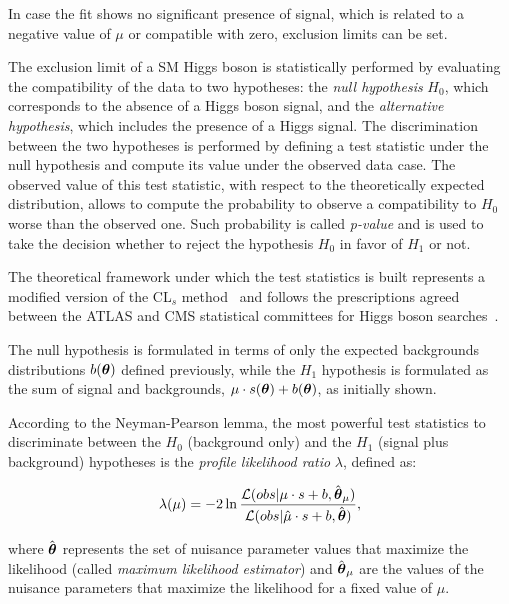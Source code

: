 In case the fit shows no significant presence of signal, which is related to a negative value of $\mu$ or compatible with zero, exclusion limits can be set.

The exclusion limit of a SM Higgs boson is statistically performed by evaluating the compatibility of the data to two hypotheses: the \emph{null hypothesis} $H_0$, which corresponds to the absence of a Higgs boson signal, and the  \emph{alternative hypothesis}, which includes the presence of a Higgs signal. The discrimination between the two hypotheses is performed by defining a test statistic under the null hypothesis and compute its value under the observed data case. The observed value of this test statistic, with respect to the theoretically expected distribution, allows to compute the probability to observe a compatibility to $H_0$ worse than the observed one. Such probability is called \emph{p-value} and is used to take the decision whether to reject the hypothesis $H_0$ in favor of $H_1$ or not.

The theoretical framework under which the test statistics is built represents a modified version of the CL$_s$ method~\cite{CLs} and follows the prescriptions agreed between the ATLAS and CMS statistical committees for Higgs boson searches~\cite{higgscombo}.

The null hypothesis is formulated in terms of only the expected backgrounds distributions $b(\boldsymbol\theta)$ defined previously, while 
the $H_1$ hypothesis is formulated as the sum of signal and backgrounds, $\mu \cdot s(\boldsymbol\theta) + b(\boldsymbol\theta)$, as initially shown.

According to the Neyman-Pearson lemma, the most powerful test statistics to discriminate between the $H_0$ (background only) and the $H_1$ (signal plus background) hypotheses is the \emph{profile likelihood ratio} $\lambda$, defined as:

\begin{equation}
\label{eq:likeratio}
\lambda(\mu) = -2 \operatorname{ln} \dfrac{\mathcal{L}(obs | \mu \cdot s + b, \hat{\boldsymbol\theta}_\mu)}{\mathcal{L}(obs | \hat{\mu} \cdot s + b, \hat{\boldsymbol\theta})},
\end{equation}

where $\hat{\boldsymbol\theta}$ represents the set of nuisance parameter values that maximize the likelihood (called \emph{maximum likelihood estimator}) and $\hat{\boldsymbol\theta}_\mu$ are the values of the nuisance parameters that maximize the likelihood for a fixed value of $\mu$.

